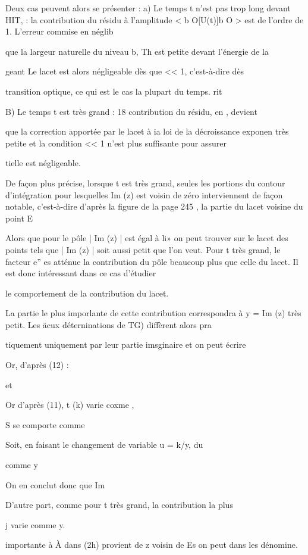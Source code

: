 Deux cas peuvent alors se présenter :
a) Le temps t n'est pas trop long devant HIT, : la contribution du résidu à
l'amplitude < b O[U(t)]b O > est de l'ordre de 1. L'erreur commise en néglib

que la largeur naturelle du niveau b, Th est petite devant l'énergie de la

geant Le lacet est alors négligeable dès que << 1, c'est-à-dire dès

transition optique, ce qui est le cas la plupart du temps. rit

B) Le temps t est très grand : 18 contribution du résidu, en , devient

que la correction apportée par le lacet à ia loi de la décroissance exponen
très petite et la condition << 1 n'est plus suffisante pour assurer

tielle est négligeable.

De façon plus précise, lorsque t est très grand, seules les portions du contour d'intégration pour lesquelles Im (z) est voisin de zéro interviennent de façon notable, c'est-à-dire d'après la figure de la page 245 ,
la partie du lacet voisine du point E

Alors que pour le pôle  | Im (z) | est égal à li» on peut
trouver sur le lacet des points tels que | Im (z) | soit aussi petit que l'on
veut. Pour t très grand, le facteur e” es atténue la contribution du pôle
beaucoup plus que celle du lacet. Il est donc intéressant dans ce cas d'étudier

le comportement de la contribution du lacet.

La partie le plus imporlante de cette contribution correspondra
à y = Im (z) très petit. Les äcux déterninations de TG) diffèrent alors pra

tiquement uniquement par leur partie imsginaire et on peut écrire

Or, d'après (12) :

et

Or d'après (11), t (k) varie coxme ,

S se comporte comme



Soit, en faisant le changement de variable u = k/y,
du

comme y

On en conclut donc que Im

D'autre part, comme pour t très grand, la contribution la plus

 j varie comme y.

importante à À dans (2h) provient de z voisin de Es on peut dans les dénomine.

